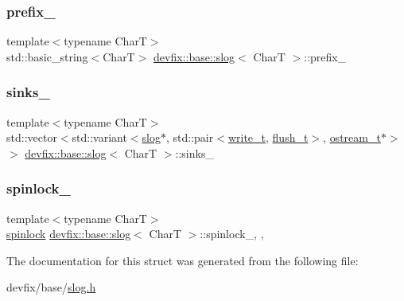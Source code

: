 \subsubsection{\texorpdfstring{prefix\+\_\+}{prefix\_}}
{\footnotesize\ttfamily template$<$typename CharT$>$ \\
std\+::basic\+\_\+string$<$CharT$>$ \hyperlink{structdevfix_1_1base_1_1slog}{devfix\+::base\+::slog}$<$ CharT $>$\+::prefix\+\_\+\hspace{0.3cm}{\ttfamily [protected]}}

\mbox{\label{structdevfix_1_1base_1_1slog_ad2da16c81e93026a8094c53c2261cb33}} 
\subsubsection{\texorpdfstring{sinks\+\_\+}{sinks\_}}
{\footnotesize\ttfamily template$<$typename CharT$>$ \\
std\+::vector$<$std\+::variant$<$\hyperlink{structdevfix_1_1base_1_1slog}{slog}$\ast$, std\+::pair$<$\hyperlink{structdevfix_1_1base_1_1slog_a5897ebe6b65ffd7a1845a6bca989f288}{write\+\_\+t}, \hyperlink{structdevfix_1_1base_1_1slog_a5c957ca5d7392786ede9f813ec40fb40}{flush\+\_\+t}$>$, \hyperlink{structdevfix_1_1base_1_1slog_a3602226e6adc9ea19626e25a0df085a6}{ostream\+\_\+t}$\ast$$>$ $>$ \hyperlink{structdevfix_1_1base_1_1slog}{devfix\+::base\+::slog}$<$ CharT $>$\+::sinks\+\_\+\hspace{0.3cm}{\ttfamily [protected]}}

\mbox{\label{structdevfix_1_1base_1_1slog_a6bfea192aed809edbca0deacdce5b8df}} 
\subsubsection{\texorpdfstring{spinlock\+\_\+}{spinlock\_}}
{\footnotesize\ttfamily template$<$typename CharT$>$ \\
\hyperlink{structdevfix_1_1base_1_1spinlock}{spinlock} \hyperlink{structdevfix_1_1base_1_1slog}{devfix\+::base\+::slog}$<$ CharT $>$\+::spinlock\+\_\+\hspace{0.3cm}{\ttfamily [inline]}, {\ttfamily [static]}, {\ttfamily [protected]}}



The documentation for this struct was generated from the following file\+:\begin{DoxyCompactItemize}
\item 
devfix/base/\hyperlink{slog_8h}{slog.\+h}\end{DoxyCompactItemize}
